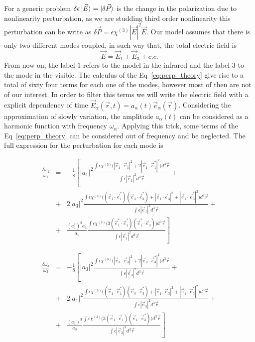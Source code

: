 For a generic problem $\delta\epsilon\ket{\vec{E}}=\ket{\delta\vec{P}}$ is the change in the polarization due to nonlinearity perturbation, as we are studding third order nonlinearity this perturbation can be write as $\delta\vec{P} = \epsilon\chi^{(3)}|\vec{E}|^2\vec{E}$. Our model assumes that there is only two different modes coupled, in such way that, the total electric field is
\begin{equation}
    \vec{E} = \vec{E}_1+\vec{E}_3+c.c.
\end{equation}
From now on, the label $1$ refers to the model in the infrared and the label $3$ to the mode in the visible. 
The calculus of the Eq~\ref{eq:perp_theory} give rise to a total of sixty four terms for each one of the modes, however most of then are not of our interest. In order to filter this terms we will write the electric field with a explicit dependency of time $\vec{E}_\alpha(\vec{r},t) = a_\alpha(t) \vec{e}_\alpha(\vec{r})$. Considering the approximation of slowly variation, the amplitude $a_\alpha(t)$ can be considered as a harmonic function with frequency $\omega_\alpha$. Applying this trick, some terms of the Eq~\ref{eq:perp_theory} can be considered out of frequency and be neglected. The full expression for the perturbation for each mode is

\begin{eqnarray}
\frac{\delta\omega_1}{\omega_1} &=& -\frac{1}{8}\left[|a_1|^2\frac{\int\epsilon\chi^{(3)}
\Big(|\vec{e}_1\cdot\vec{e}_1|^2 + 2|\vec{e}_1\cdot\vec{e}_1^*|^2
\Big)d^3\vec{r}}
{\int \epsilon|\vec{e}_1|^2 d^3\vec{r}}\right. +\nonumber\\
&+&2|a_3|^2\frac{\int\epsilon\chi^{(3)}
\Big((\vec{e}_1\cdot\vec{e}_1^*)(\vec{e}_3\cdot\vec{e}_3^*)+|\vec{e}_1\cdot\vec{e}_3|^2+|\vec{e}_1\cdot\vec{e}^*_3|^2
\Big)d^3\vec{r}}
{\int \epsilon|\vec{e}_1|^2 d^3\vec{r}}+\nonumber\\
&+&\left.\frac{(a^*_1)^2a_3}{a_1}\frac{\int\epsilon\chi^{(3)}
\Big(3(\vec{e}^*_1\cdot\vec{e}_1^*)(\vec{e}^*_1\cdot\vec{e}_3)
\Big)d^3\vec{r}}
{\int \epsilon|\vec{e}_1|^2 d^3\vec{r}}\right]
\end{eqnarray}

\begin{eqnarray}
\frac{\delta\omega_3}{\omega_3} &=& -\frac{1}{8}\left[|a_3|^2\frac{\int\epsilon\chi^{(3)}
\Big(|\vec{e}_3\cdot\vec{e}_3|^2 + 2|\vec{e}_3\cdot\vec{e}_3^*|^2
\Big)d^3\vec{r}}
{\int \epsilon|\vec{e}_3|^2 d^3\vec{r}}\right. +\nonumber\\
&+&2|a_1|^2\frac{\int\epsilon\chi^{(3)}
\Big((\vec{e}_1\cdot\vec{e}_1^*)(\vec{e}_3\cdot\vec{e}_3^*)+|\vec{e}_1\cdot\vec{e}_3|^2+|\vec{e}_1\cdot\vec{e}^*_3|^2
\Big)d^3\vec{r}}
{\int \epsilon|\vec{e}_3|^2 d^3\vec{r}}+\nonumber\\
&+&\left.\frac{(a_1)^3}{a_3}\frac{\int\epsilon\chi^{(3)}
\Big(3(\vec{e}_1\cdot\vec{e}_1)(\vec{e}_1\cdot\vec{e}^*_3)
\Big)d^3\vec{r}}
{\int \epsilon|\vec{e}_3|^2 d^3\vec{r}}\right]
\end{eqnarray}

